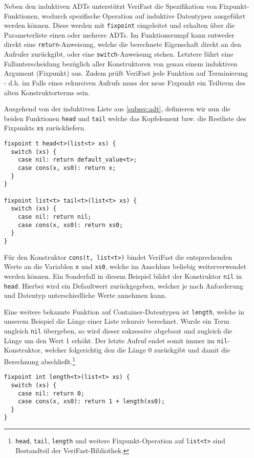 Neben den induktiven ADTs unterstützt VeriFast die Spezifikation von Fix\-punkt-Funktionen, wodurch spezifische Operation auf induktive Datentypen ausgeführt werden können. Diese werden mit \texttt{fixpoint} eingeleitet und erhalten über die Parameterliste einen oder mehrere ADTs. Im Funktionsrumpf kann entweder direkt eine \texttt{return}-Anweisung, welche die berechnete Eigenschaft direkt an den Aufrufer zurückgibt, oder eine \texttt{switch}-Anweisung stehen. Letztere führt eine Fallunterscheidung bezüglich aller Konstruktoren von genau einem induktiven Argument (Fixpunkt) aus. Zudem prüft VeriFast jede Funktion auf Terminierung - d.h. im Falle eines rekursiven Aufrufs muss der neue Fixpunkt ein Teilterm des alten Konstruktorterms sein. \cite{Jacobs2010}

Ausgehend von der induktiven Liste aus \cref{subsec:adt}, definieren wir nun die beiden Funktionen \texttt{head} und \texttt{tail} welche das Kopfelement bzw. die Restliste des Fixpunkts \texttt{xs} zurückliefern.

\begin{lstlisting}
fixpoint t head<t>(list<t> xs) {
  switch (xs) {
    case nil: return default_value<t>;
    case cons(x, xs0): return x;
  }
}

fixpoint list<t> tail<t>(list<t> xs) {
  switch (xs) {
    case nil: return nil;
    case cons(x, xs0): return xs0;
  }
}
\end{lstlisting}

\noindent
Für den Konstruktor \texttt{cons(t, list<t>)} bindet VeriFast die entsprechenden Werte an die Variablen \texttt{x} und \texttt{xs0}, welche im Anschluss beliebig weiterverwendet werden können. Ein Sonderfall in diesem Beispiel bildet der Konstruktor \texttt{nil} in \texttt{head}. Hierbei wird ein Defaultwert zurückgegeben, welcher je nach Anforderung und Datentyp unterschiedliche Werte annehmen kann.

Eine weitere bekannte Funktion auf Container-Datentypen ist \texttt{length}, welche in unserem Beispiel die Länge einer Liste rekursiv berechnet. Wurde ein Term ungleich \texttt{nil} übergeben, so wird dieser sukzessive abgebaut und zugleich die Länge um den Wert 1 erhöht. Der letzte Aufruf endet somit immer im \texttt{nil}-Konstruktor, welcher folgerichtig den die Länge 0 zurückgibt und damit die Berechnung abschließt.\footnote{\texttt{head}, \texttt{tail}, \texttt{length} und weitere Fixpunkt-Operation auf \texttt{list<t>} sind Bestandteil der VeriFast-Bibliothek.}

\begin{lstlisting}
fixpoint int length<t>(list<t> xs) {
  switch (xs) {
    case nil: return 0;
    case cons(x, xs0): return 1 + length(xs0);
  }
}
\end{lstlisting}

